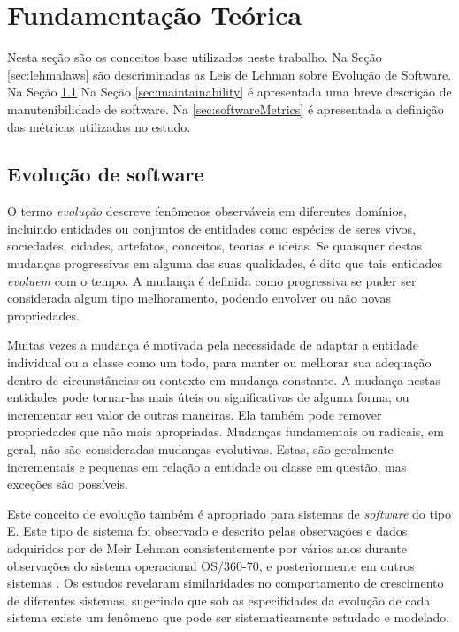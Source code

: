 \chapter{Fundamentação Teórica}
\label{chapter:fundamentos}

Nesta seção são os conceitos base utilizados neste trabalho. Na Seção \ref{sec:lehmalaws} são descriminadas as Leis de Lehman sobre Evolução de Software. Na Seção \ref{} Na Seção \ref{sec:maintainability} é apresentada uma breve descrição de manutenibilidade de software. Na \ref{sec:softwareMetrics} é apresentada a definição das métricas utilizadas no estudo.
\section{Evolução de software}
O termo \textit{evolução} descreve fenômenos observáveis em diferentes domínios, incluindo entidades ou conjuntos de entidades como espécies de seres vivos, sociedades, cidades, artefatos, conceitos, teorias e ideias. Se quaisquer destas mudanças progressivas em alguma das suas qualidades, é dito que tais entidades \textit{evoluem} com o tempo. A mudança é definida como progressiva se puder ser considerada algum tipo melhoramento, podendo envolver ou não novas propriedades.

Muitas vezes a mudança é motivada pela necessidade de adaptar a entidade individual ou a classe como um todo, para manter ou melhorar sua adequação dentro de circunstâncias ou contexto em mudança constante. A mudança nestas entidades pode tornar-las mais úteis ou significativas de alguma forma, ou incrementar seu valor de outras maneiras. Ela também pode remover propriedades que não mais apropriadas. Mudanças fundamentais ou radicais, em geral, não são consideradas mudanças evolutivas. Estas, são geralmente incrementais e pequenas em relação a entidade ou classe em questão, mas exceções são possíveis.

Este conceito de evolução também é apropriado para sistemas de \textit{software} do tipo E. Este tipo de sistema foi observado e descrito pelas observações e dados adquiridos por de Meir Lehman consistentemente por vários anos durante observações do sistema operacional OS/360-70, e posteriormente em outros sistemas \cite{lehman1979understanding,lehman1980programs,lehman1985program}. Os estudos revelaram similaridades no comportamento de crescimento de diferentes sistemas, sugerindo que sob as especifidades da evolução de cada sistema existe um fenômeno que pode ser sistematicamente estudado e modelado. 

